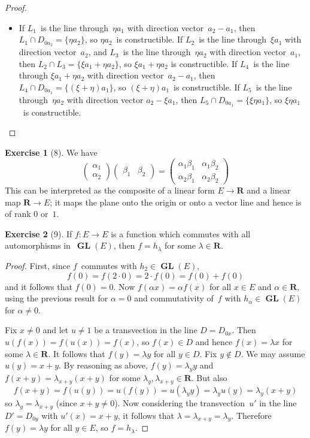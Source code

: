 \documentclass[letterpaper,12pt]{article}
\newcommand{\R}{\mathbf{R}}
\newcommand{\sect}{\cap}
\newcommand{\mult}{\cdot}
\DeclareMathOperator{\GL}{\mathbf{GL}}
\theoremstyle{definition}
\newtheorem*{exer}{Exercise}
\theoremstyle{remark}
\begin{document}
\begin{proof}
\begin{itemize}[itemsep=0pt]
\item If \(L_1\)~is the line through~\(\eta a_1\) with direction vector~\(a_2-a_1\), then \(L_1\sect D_{0a_2}=\{\eta a_2\}\), so \(\eta a_2\)~is constructible. If \(L_2\)~is the line through~\(\xi a_1\) with direction vector~\(a_2\), and \(L_3\)~is the line through~\(\eta a_2\) with direction vector~\(a_1\), then \(L_2\sect L_3=\{\xi a_1+\eta a_2\}\), so \(\xi a_1+\eta a_2\) is constructible. If \(L_4\)~is the line through \(\xi a_1+\eta a_2\) with direction vector~\(a_2-a_1\), then \(L_4\sect D_{0a_1}=\{(\xi+\eta)a_1\}\), so \((\xi+\eta)a_1\)~is constructible. If \(L_5\)~is the line through~\(\eta a_2\) with direction vector \(a_2-\xi a_1\), then \(L_5\sect D_{0a_1}=\{\xi\eta a_1\}\), so \(\xi\eta a_1\)~is constructible.

\end{itemize}
\end{proof}

\begin{exer}[8]
We have
\[\begin{pmatrix}
\alpha_1\\
\alpha_2
\end{pmatrix}
\begin{pmatrix}
\beta_1&\beta_2
\end{pmatrix}
=
\begin{pmatrix}
\alpha_1\beta_1&\alpha_1\beta_2\\
\alpha_2\beta_1&\alpha_2\beta_2
\end{pmatrix}\]
This can be interpreted as the composite of a linear form \(E\to\R\) and a linear map \(\R\to E\); it maps the plane onto the origin or onto a vector line and hence is of rank \(0\) or~\(1\).
\end{exer}

\begin{exer}[9]
If \(f:E\to E\) is a function which commutes with all automorphisms in~\(\GL(E)\), then \(f=h_{\lambda}\) for some \(\lambda\in\R\).
\end{exer}
\begin{proof}
First, since \(f\)~commutes with \(h_2\in\GL(E)\),
\[f(0)=f(2\mult 0)=2\mult f(0)=f(0)+f(0)\]
and it follows that \(f(0)=0\). Now \(f(\alpha x)=\alpha f(x)\) for all \(x\in E\) and \(\alpha\in\R\), using the previous result for \(\alpha=0\) and commutativity of~\(f\) with \(h_{\alpha}\in\GL(E)\) for \(\alpha\ne0\).

Fix \(x\ne 0\) and let \(u\ne 1\) be a transvection in the line \(D=D_{0x}\). Then \(u(f(x))=f(u(x))=f(x)\), so \(f(x)\in D\) and hence \(f(x)=\lambda x\) for some \(\lambda\in\R\). It follows that \(f(y)=\lambda y\) for all \(y\in D\). Fix \(y\not\in D\). We may assume \(u(y)=x+y\). By reasoning as above, \(f(y)=\lambda_y y\) and \(f(x+y)=\lambda_{x+y}(x+y)\) for some \(\lambda_y,\lambda_{x+y}\in\R\). But also
\[f(x+y)=f(u(y))=u(f(y))=u(\lambda_y y)=\lambda_y u(y)=\lambda_y(x+y)\]
so \(\lambda_y=\lambda_{x+y}\) (since \(x+y\ne 0\)). Now considering the transvection~\(u'\) in the line \(D'=D_{0y}\) with \(u'(x)=x+y\), it follows that \(\lambda=\lambda_{x+y}=\lambda_y\). Therefore \(f(y)=\lambda y\) for all \(y\in E\), so \(f=h_{\lambda}\).
\end{proof}
\end{document}
